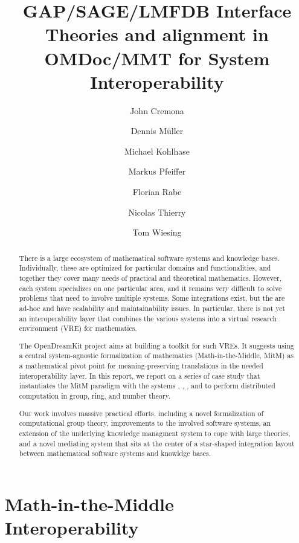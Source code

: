 \documentclass[book]{deliverablereport}
\title{GAP/SAGE/LMFDB Interface Theories and alignment in OMDoc/MMT for System Interoperability}
\author{John Cremona}
\author{Dennis M\"uller}
\author{Michael Kohlhase}
\author{Markus Pfeiffer}
\author{Florian Rabe}
\author{Nicolas Thierry}
\author{Tom Wiesing}
\def\papertype{report\xspace}
\begin{document}
\begin{abstract}
  There is a large ecosystem of mathematical software systems and knowledge bases.
  Individually, these are optimized for particular domains and functionalities, and
  together they cover many needs of practical and theoretical mathematics.  However, each
  system specializes on one particular area, and it remains very difficult to solve
  problems that need to involve multiple systems.  Some integrations exist, but the are
  ad-hoc and have scalability and maintainability issues.  In particular, there is not yet
  an interoperability layer that combines the various systems into a virtual research
  environment (VRE) for mathematics.
  
  The OpenDreamKit project aims at building a toolkit for such VREs.  It suggests using a
  central system-agnostic formalization of mathematics (Math-in-the-Middle, MitM) as a
  mathematical pivot point for meaning-preserving translations in the needed
  interoperability layer.  In this \papertype, we report on a series of case study that
  instantiates the MitM paradigm with the systems \GAP, \Sage, \LMFDB, and
  \Singular{} to perform distributed computation in group,
  ring, and number theory.
 
  Our work involves massive practical efforts, including a novel formalization of
  computational group theory, improvements to the involved software systems, an extension
  of the underlying knowledge managment system to cope with large theories, and a novel
  mediating system that sits at the center of a star-shaped integration layout between
  mathematical software systems and knowldge bases.
\end{abstract}

\maketitle
\setcounter{tocdepth}{2}
\newpage\tableofcontents\newpage
{}



\section[MitM Interoperability]{Math-in-the-Middle Interoperability}\label{sec:mitm}

\end{document}
